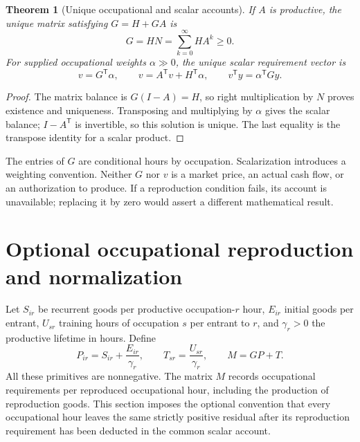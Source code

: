 \documentclass[11pt,a4paper]{article}
\newtheorem{theorem}{Theorem}[section]
\begin{document}
\begin{theorem}[Unique occupational and scalar accounts]
If $A$ is productive, the unique matrix satisfying $G=H+GA$ is
\begin{equation}
G=HN=\sum_{k=0}^{\infty}HA^k\geq0.
\end{equation}
For supplied occupational weights $\alpha\gg0$, the unique scalar requirement vector is
\begin{equation}
v=G^{\mathsf T}\alpha,
\qquad v=A^{\mathsf T}v+H^{\mathsf T}\alpha,
\qquad v^{\mathsf T}y=\alpha^{\mathsf T}Gy.
\end{equation}
\end{theorem}
\begin{proof}
The matrix balance is $G(I-A)=H$, so right multiplication by $N$ proves existence and uniqueness. Transposing and multiplying by $\alpha$ gives the scalar balance; $I-A^{\mathsf T}$ is invertible, so this solution is unique. The last equality is the transpose identity for a scalar product.
\end{proof}

The entries of $G$ are conditional hours by occupation. Scalarization introduces a weighting convention. Neither $G$ nor $v$ is a market price, an actual cash flow, or an authorization to produce. If a reproduction condition fails, its account is unavailable; replacing it by zero would assert a different mathematical result.

\section{Optional occupational reproduction and normalization}
Let $S_{ir}$ be recurrent goods per productive occupation-$r$ hour, $E_{ir}$ initial goods per entrant, $U_{sr}$ training hours of occupation $s$ per entrant to $r$, and $\gamma_r>0$ the productive lifetime in hours. Define
\begin{equation}
P_{ir}=S_{ir}+\frac{E_{ir}}{\gamma_r},\qquad
T_{sr}=\frac{U_{sr}}{\gamma_r},\qquad M=GP+T.
\end{equation}
All these primitives are nonnegative. The matrix $M$ records occupational requirements per reproduced occupational hour, including the production of reproduction goods. This section imposes the optional convention that every occupational hour leaves the same strictly positive residual after its reproduction requirement has been deducted in the common scalar account.
\end{document}
